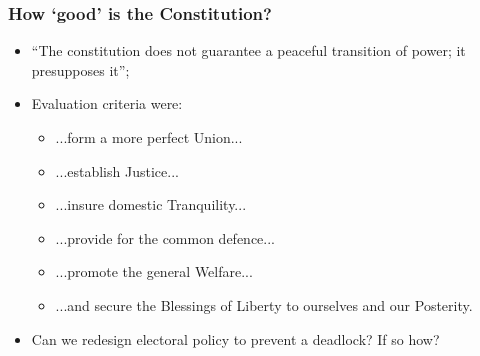 \documentclass[aspectratio=169]{beamer}
\theoremstyle{principle}
\begin{document}
\begin{frame}
\frametitle{How `good' is the Constitution?}

\begin{itemize}
\item “The constitution does not guarantee a peaceful transition of power; it presupposes it”;
\bigskip
\bigskip
\item Evaluation criteria were:
\begin{itemize}
\item ...form a more perfect Union...
\item ...establish Justice...
\item ...insure domestic Tranquility...
\item ...provide for the common defence... 
\item ...promote the general Welfare... 
\item ...and secure the Blessings of Liberty to ourselves and our Posterity.
\end{itemize}
\bigskip
\bigskip
\item Can we redesign electoral policy to prevent a deadlock?  If so how?
\end{itemize}

\end{frame}
\end{document}
